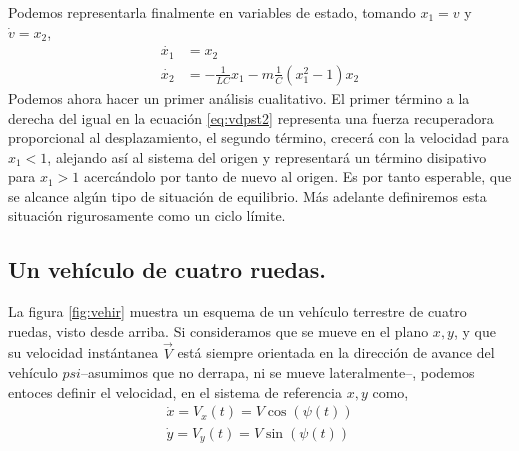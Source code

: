 Podemos representarla finalmente en variables de estado, tomando $x_1=v$ y $\dot{v}=x_2$,
\begin{align}
\dot{x_1} &= x_2\\
\dot{x_2} &= -\frac{1}{LC}x_1 - m\frac{1}{C}(x_1^2-1)x_2 \label{eq:vdpst2}
\end{align}
Podemos ahora hacer un primer análisis cualitativo. El primer término a la derecha del igual en  la ecuación \ref{eq:vdpst2} representa una fuerza recuperadora proporcional al desplazamiento, el segundo término, crecerá con la velocidad para $x_1 < 1$, alejando así al sistema del origen  y representará un término disipativo para $x_1 > 1$ acercándolo por tanto de nuevo al origen. Es por tanto esperable, que se alcance
algún tipo de situación de equilibrio. Más adelante definiremos esta situación rigurosamente como un ciclo límite. 
\subsection{Un vehículo de cuatro ruedas. }
La figura \ref{fig:vehir} muestra un esquema de un vehículo terrestre de cuatro ruedas, visto desde arriba. Si consideramos que se mueve en el plano $x,y$, y que su velocidad instántanea $\vec{V}$ está siempre orientada en la dirección de avance del vehículo $psi$--asumimos que no derrapa, ni se mueve lateralmente--, podemos entoces definir el velocidad, en el sistema de referencia $x,y$ como,
\begin{align}
\dot{x} = V_x(t) = V\cos(\psi(t))\\
\dot{y} = V_y(t) = V\sin(\psi(t))\\
\end{align}

